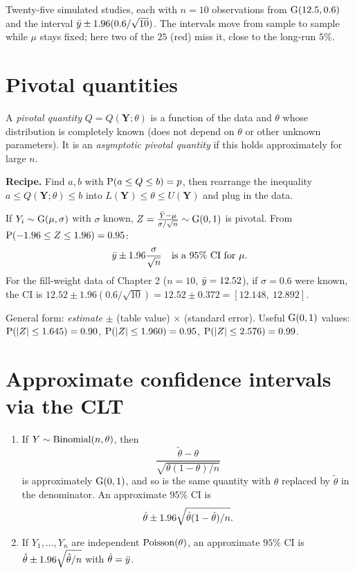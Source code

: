 Twenty-five simulated studies, each with $n=10$ observations from $\operatorname{G}(12.5, 0.6)$ and the
interval $\bar{y}\pm1.96(0.6/\sqrt{10})$. The intervals move from sample to sample while $\mu$
stays fixed; here two of the $25$ (red) miss it, close to the long-run $5\%$.

\section{Pivotal quantities}

\begin{definition}
A \emph{pivotal quantity} $Q = Q(\mathbf Y;\theta)$ is a function of the data and $\theta$
whose distribution is completely known (does not depend on $\theta$ or other unknown
parameters). It is an \emph{asymptotic pivotal quantity} if this holds approximately for
large $n$.
\end{definition}

\textbf{Recipe.} Find $a,b$ with $\operatorname{P}(a\le Q\le b) = p$, then rearrange the
inequality $a\le Q(\mathbf Y;\theta)\le b$ into $L(\mathbf Y)\le\theta\le U(\mathbf Y)$ and
plug in the data.

\begin{example}
If $Y_i\sim\operatorname{G}(\mu,\sigma)$ with $\sigma$ known, $Z = \frac{\bar{Y}-\mu}{\sigma/\sqrt n}\sim
\operatorname{G}(0,1)$ is pivotal. From $\operatorname{P}(-1.96\le Z\le 1.96) = 0.95$:
\[
\bar{y} \pm 1.96\frac{\sigma}{\sqrt n}\quad\text{is a 95\% CI for } \mu.
\]
For the fill-weight data of Chapter 2 ($n=10$, $\bar{y}=12.52$), if $\sigma=0.6$ were known,
the CI is $12.52\pm 1.96(0.6/\sqrt{10}) = 12.52 \pm 0.372 = [12.148,\ 12.892]$.
\end{example}

General form: \emph{estimate} $\pm$ (table value) $\times$ (standard error). Useful
$\operatorname{G}(0,1)$ values: $\operatorname{P}(|Z|\le 1.645) = 0.90$, $\operatorname{P}(|Z|\le1.960)=0.95$,
$\operatorname{P}(|Z|\le 2.576) = 0.99$.

\section{Approximate confidence intervals via the CLT}

\begin{theorem}
\begin{enumerate}
  \item If $Y\sim\operatorname{Binomial}(n,\theta)$, then
        \[ \frac{\tilde\theta-\theta}{\sqrt{\theta(1-\theta)/n}} \]
        is approximately $\operatorname{G}(0,1)$, and so is the same quantity with $\theta$ replaced
        by $\tilde\theta$ in the denominator. An approximate $95\%$ CI is
        \[ \hat{\theta}\pm 1.96\sqrt{\hat{\theta}(1-\hat{\theta})/n}. \]
  \item If $Y_1,\dots,Y_n$ are independent $\operatorname{Poisson}(\theta)$, an approximate $95\%$ CI is
        $\hat{\theta}\pm 1.96\sqrt{\hat{\theta}/n}$ with $\hat{\theta}=\bar{y}$.
\end{enumerate}
\end{theorem}

